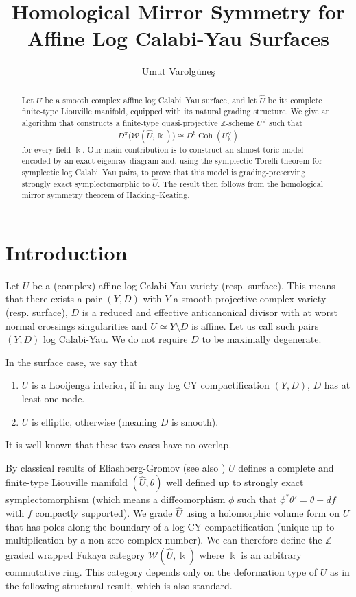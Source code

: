 \documentclass[11pt, reqno]{amsart}
\title[HMS for Affine Log CY Surfaces]{Homological Mirror Symmetry for Affine Log Calabi-Yau Surfaces}
\author{Umut Varolg\"une\c{s}}
\theoremstyle{definition}
\begin{document}
\maketitle

\begin{abstract}
Let $U$ be a smooth complex affine log Calabi--Yau surface, and let
$\widehat{U}$ be its complete finite-type Liouville manifold, equipped
with its natural grading structure. We give an algorithm that constructs
a finite-type quasi-projective $\mathbb{Z}$-scheme $U^\vee$ such that
\[
D^\pi\bigl(\mathcal{W}(\widehat{U},\Bbbk)\bigr)
\cong
D^b\operatorname{Coh}(U^\vee_{\Bbbk})
\]
for every field $\Bbbk$. Our main contribution is to construct an almost
toric model encoded by an exact eigenray diagram and, using the
symplectic Torelli theorem for symplectic log Calabi--Yau pairs, to prove that this
model is grading-preserving strongly exact symplectomorphic to
$\widehat{U}$. The result then follows from the homological mirror
symmetry theorem of Hacking--Keating.
\end{abstract}

\section{Introduction}

Let $U$ be a (complex) affine log Calabi-Yau variety (resp. surface). This means that there exists a pair $(Y,D)$ with $Y$ a smooth projective complex variety (resp. surface), $D$ is a reduced and effective anticanonical divisor with at worst normal crossings singularities and $U\simeq Y\setminus D$ is affine. Let us call such pairs $(Y,D)$ log Calabi-Yau. We do not require $D$ to be maximally degenerate. 

In the surface case, we say that \begin{enumerate}
    \item $U$ is a Looijenga interior, if in any log CY compactification $(Y,D)$, $D$ has at least one node.
    \item $U$ is elliptic, otherwise (meaning $D$ is smooth).
\end{enumerate} It is well-known that these two cases have no overlap.

By classical results of Eliashberg-Gromov \cite{EG91} (see also \cite{CE}) $U$ defines a complete and finite-type Liouville manifold $(\widehat{U},\theta)$ well defined up to strongly exact symplectomorphism (which means a diffeomorphism $\phi$ such that $\phi^*\theta'=\theta+df$ with $f$ compactly supported). We grade $\widehat{U}$ using a holomorphic volume form on $U$ that has poles along the boundary of a log CY compactification (unique up to multiplication by a non-zero complex number). We can therefore define the $\mathbb{Z}$-graded wrapped Fukaya category $\mathcal{W}(\widehat{U},\Bbbk)$ where $\Bbbk$ is an arbitrary commutative ring. This category depends only on the deformation type of $U$ as in the following structural result, which is also standard.
\end{document}
